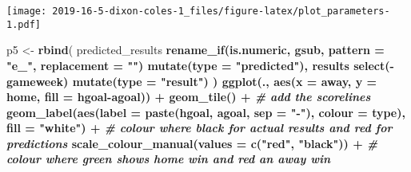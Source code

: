 \documentclass[]{article}
\newenvironment{Shaded}{\begin{snugshade}}{\end{snugshade}}
\newcommand{\KeywordTok}[1]{\textcolor[rgb]{0.13,0.29,0.53}{\textbf{#1}}}
\newcommand{\DataTypeTok}[1]{\textcolor[rgb]{0.13,0.29,0.53}{#1}}
\newcommand{\DecValTok}[1]{\textcolor[rgb]{0.00,0.00,0.81}{#1}}
\newcommand{\StringTok}[1]{\textcolor[rgb]{0.31,0.60,0.02}{#1}}
\newcommand{\CommentTok}[1]{\textcolor[rgb]{0.56,0.35,0.01}{\textit{#1}}}
\newcommand{\OperatorTok}[1]{\textcolor[rgb]{0.81,0.36,0.00}{\textbf{#1}}}
\newcommand{\NormalTok}[1]{#1}
\begin{document}
\texttt{[image: 2019-16-5-dixon-coles-1\_files/figure-latex/plot\_parameters-1.pdf]}

\begin{Shaded}
\end{Shaded}

\begin{Shaded}
\begin{Highlighting}[]
\NormalTok{p5 <-}\StringTok{ }\KeywordTok{rbind}\NormalTok{(}
\NormalTok{  predicted_results }\OperatorTok{%>%}
\StringTok{    }\KeywordTok{rename_if}\NormalTok{(is.numeric, gsub, }\DataTypeTok{pattern =} \StringTok{"e_"}\NormalTok{, }\DataTypeTok{replacement =} \StringTok{""}\NormalTok{) }\OperatorTok{%>%}
\StringTok{    }\KeywordTok{mutate}\NormalTok{(}\DataTypeTok{type =} \StringTok{"predicted"}\NormalTok{),}
\NormalTok{  results }\OperatorTok{%>%}
\StringTok{    }\KeywordTok{select}\NormalTok{(}\OperatorTok{-}\NormalTok{gameweek) }\OperatorTok{%>%}
\StringTok{    }\KeywordTok{mutate}\NormalTok{(}\DataTypeTok{type =} \StringTok{"result"}\NormalTok{)}
\NormalTok{) }\OperatorTok{%>%}
\StringTok{  }\KeywordTok{ggplot}\NormalTok{(., }\KeywordTok{aes}\NormalTok{(}\DataTypeTok{x =}\NormalTok{ away, }\DataTypeTok{y =}\NormalTok{ home, }\DataTypeTok{fill =}\NormalTok{ hgoal}\OperatorTok{-}\NormalTok{agoal)) }\OperatorTok{+}
\StringTok{  }\KeywordTok{geom_tile}\NormalTok{() }\OperatorTok{+}
\StringTok{  }\CommentTok{# add the scorelines}
\StringTok{  }\KeywordTok{geom_label}\NormalTok{(}\KeywordTok{aes}\NormalTok{(}\DataTypeTok{label =} \KeywordTok{paste}\NormalTok{(hgoal, agoal, }\DataTypeTok{sep =} \StringTok{"-"}\NormalTok{), }\DataTypeTok{colour =}\NormalTok{ type), }\DataTypeTok{fill =} \StringTok{"white"}\NormalTok{) }\OperatorTok{+}
\StringTok{  }\CommentTok{# colour where black for actual results and red for predictions}
\StringTok{  }\KeywordTok{scale_colour_manual}\NormalTok{(}\DataTypeTok{values =} \KeywordTok{c}\NormalTok{(}\StringTok{"red"}\NormalTok{, }\StringTok{"black"}\NormalTok{)) }\OperatorTok{+}
\StringTok{  }\CommentTok{# colour where green shows home win and red an away win}
}}}}}
\end{Highlighting}
\end{Shaded}
\end{document}
